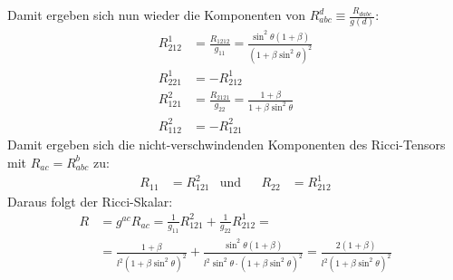 \documentclass[a4paper,12pt]{article}
\newcommand{\tecxt}{}
\begin{document}
Damit ergeben sich nun wieder die Komponenten von $R^d_{abc}\equiv\frac{R_{dabc}}{g(d)}$:
\begin{align*}
R^1_{212}&=\frac{R_{1212}}{g_{11}}=\frac{\sin^2\theta(1+\beta)}{(1+\beta\sin^2\theta)^2}\\
R^1_{221}&=-R^1_{212}\\
R^2_{121}&=\frac{R_{2121}}{g_{22}}=\frac{1+\beta}{1+\beta\sin^2\theta}\\
R^2_{112}&=-R^2_{121}
\end{align*}
Damit ergeben sich die nicht-verschwindenden Komponenten des Ricci-Tensors mit $R_{ac}=R^b_{abc}$ zu:
\begin{align*}
R_{11}&=R^2_{121}&\tecxt\text{und}&&R_{22}&=R^1_{212}
\end{align*}
Daraus folgt der Ricci-Skalar:
\begin{align*}
R&=g^{ac}R_{ac}=\frac{1}{g_{11}}R^2_{121}+\frac{1}{g_{22}}R^1_{212}=\\
&=\frac{1+\beta}{l^2(1+\beta\sin^2\theta)^2}+\frac{\sin^2\theta(1+\beta)}{l^2\sin^2\theta\cdot (1+\beta\sin^2\theta)^2}=\frac{2(1+\beta)}{l^2(1+\beta\sin^2\theta)^2}
\end{align*}\newpage
\end{document}
